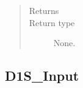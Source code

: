 \documentclass[letterpaper,10pt,english]{sphinxmanual}
\begin{document}
\begin{fulllineitems}
\begin{fulllineitems}
\begin{quote}
\begin{description}
\item[{Returns}] \leavevmode
\sphinxAtStartPar


\item[{Return type}] \leavevmode
\sphinxAtStartPar
None.

\end{description}\end{quote}

\end{fulllineitems}


\end{fulllineitems}



\subsection{D1S\_Input}
\label{\detokenize{api/inputgeneration:d1s-input}}
\end{document}
